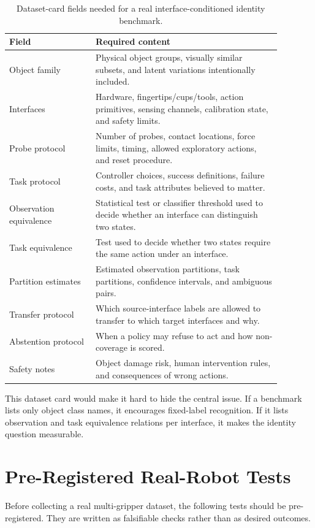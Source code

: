 \documentclass{article}
\begin{document}
\begin{table}[h]
\centering
\caption{Dataset-card fields needed for a real interface-conditioned identity benchmark.}
\small
\begin{tabular}{p{0.28\linewidth}p{0.60\linewidth}}
\toprule
Field & Required content \\
\midrule
Object family & Physical object groups, visually similar subsets, and latent variations intentionally included. \\
Interfaces & Hardware, fingertips/cups/tools, action primitives, sensing channels, calibration state, and safety limits. \\
Probe protocol & Number of probes, contact locations, force limits, timing, allowed exploratory actions, and reset procedure. \\
Task protocol & Controller choices, success definitions, failure costs, and task attributes believed to matter. \\
Observation equivalence & Statistical test or classifier threshold used to decide whether an interface can distinguish two states. \\
Task equivalence & Test used to decide whether two states require the same action under an interface. \\
Partition estimates & Estimated observation partitions, task partitions, confidence intervals, and ambiguous pairs. \\
Transfer protocol & Which source-interface labels are allowed to transfer to which target interfaces and why. \\
Abstention protocol & When a policy may refuse to act and how non-coverage is scored. \\
Safety notes & Object damage risk, human intervention rules, and consequences of wrong actions. \\
\bottomrule
\end{tabular}
\end{table}

This dataset card would make it hard to hide the central issue.
If a benchmark lists only object class names, it encourages fixed-label recognition.
If it lists observation and task equivalence relations per interface, it makes the identity question measurable.

\section{Pre-Registered Real-Robot Tests}

Before collecting a real multi-gripper dataset, the following tests should be pre-registered.
They are written as falsifiable checks rather than as desired outcomes.
\end{document}
